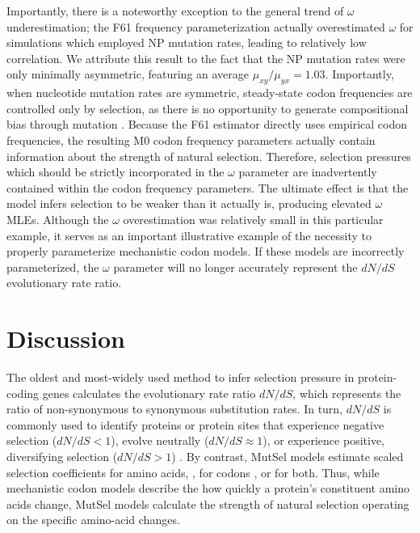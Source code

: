 \documentclass{pnastwo}
\begin{document}
\begin{article}
Importantly, there is a noteworthy exception to the general trend of $\omega$ underestimation; the F61 frequency parameterization actually overestimated $\omega$ for simulations which employed NP mutation rates, leading to relatively low correlation. We attribute this result to the fact that the NP mutation rates were only minimally asymmetric, featuring an average $\mu_{xy}/\mu_{yx} = 1.03$. Importantly, when nucleotide mutation rates are symmetric, steady-state codon frequencies are controlled only by selection, as there is no opportunity to generate compositional bias through mutation \cite{SellaHirsh2005}. Because the F61 estimator directly uses empirical codon frequencies, the resulting M0 codon frequency parameters actually contain information about the strength of natural selection. Therefore, selection pressures which should be strictly incorporated in the $\omega$ parameter are inadvertently contained within the codon frequency parameters. The ultimate effect is that the model infers selection to be weaker than it actually is, producing elevated $\omega$ MLEs. Although the $\omega$ overestimation was relatively small in this particular example, it serves as an important illustrative example of the necessity to properly parameterize mechanistic codon models. If these models are incorrectly parameterized, the $\omega$ parameter will no longer accurately represent the $dN/dS$ evolutionary rate ratio.



\section*{Discussion}


The oldest and most-widely used method to infer selection pressure in protein-coding genes calculates the evolutionary rate ratio $dN/dS$, which represents the ratio of non-synonymous to synonymous substitution rates. In turn, $dN/dS$ is commonly used to identify proteins or protein sites that experience negative selection ($dN/dS<1$), evolve neutrally ($dN/dS\approx1$), or experience positive, diversifying selection ($dN/dS>1$) \cite{NielsenYang1998, Yangetal2000, KosakovskyPondFrost2005}. By contrast, MutSel models estimate scaled selection coefficients for amino acids, \cite{HalpernBruno1998,YangNielsen2008,Rodrigueetal2010,Tamurietal2012,Tamurietal2014}, for codons \cite{YangNielsen2008}, or for both. Thus, while mechanistic codon models describe the how quickly a protein's constituent amino acids change, MutSel models calculate the strength of natural selection operating on the specific amino-acid changes.  


\end{article}
\end{document}
